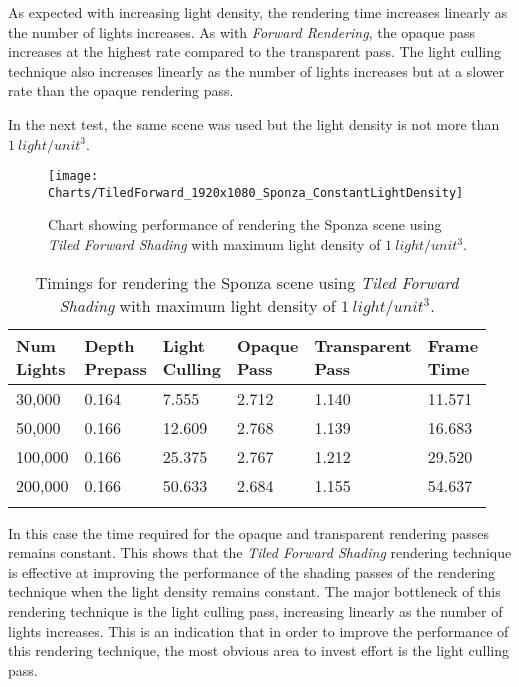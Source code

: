 As expected with increasing light density, the rendering time increases linearly as the number of lights increases. As with \emph{Forward Rendering}, the opaque pass increases at the highest rate compared to the transparent pass. The light culling technique also increases linearly as the number of lights increases but at a slower rate than the opaque rendering pass. 

In the next test, the same scene was used but the light density is not more than $1~light/unit^3$.

\begin{figure}[H]
\centering
\texttt{[image: Charts/TiledForward\_1920x1080\_Sponza\_ConstantLightDensity]}
\decoRule
\caption{Chart showing performance of rendering the Sponza scene using \emph{Tiled Forward Shading} with maximum light density of $1~light/unit^3$.}
\label{fig:TiledForward_1920x1080_Sponza_ConstantLightDensity}
\end{figure}


\begin{table}[H]
\caption{Timings for rendering the Sponza scene using \emph{Tiled Forward Shading} with maximum light density of $1~light/unit^3$.}
\label{tab:TiledForward_1920x1080_Sponza_ConstantLightDensity}
\centering
\begin{tabular}{*{6}{l}}
\toprule
\thead{Num \\Lights} & \thead{Depth \\Prepass} & \thead{Light \\Culling} & \thead{Opaque \\Pass} & \thead{Transparent \\Pass} & \thead{Frame \\Time } \\
\midrule
30,000 & 0.164 & 7.555 & 2.712 & 1.140 & 11.571 \\
50,000 & 0.166 & 12.609 & 2.768 & 1.139 & 16.683 \\
100,000 & 0.166 & 25.375 & 2.767 & 1.212 & 29.520 \\
200,000 & 0.166 & 50.633 & 2.684 & 1.155 & 54.637 \\
\bottomrule\\
\end{tabular}
\end{table}

In this case the time required for the opaque and transparent rendering passes remains constant. This shows that the \emph{Tiled Forward Shading} rendering technique is effective at improving the performance of the shading passes of the rendering technique when the light density remains constant. The major bottleneck of this rendering technique is the light culling pass, increasing linearly as the number of lights increases. This is an indication that in order to improve the performance of this rendering technique, the most obvious area to invest effort is the light culling pass.

